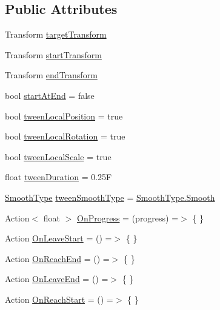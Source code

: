 \subsection*{Public Attributes}
\begin{DoxyCompactItemize}
\item 
Transform \mbox{\hyperlink{class_leap_1_1_unity_1_1_animation_1_1_transform_tween_behaviour_aacffaec9164854dadaa2243119d2ce77}{target\+Transform}}
\item 
Transform \mbox{\hyperlink{class_leap_1_1_unity_1_1_animation_1_1_transform_tween_behaviour_aa8078632530d2648ecc6e7fdaa1df7c2}{start\+Transform}}
\item 
Transform \mbox{\hyperlink{class_leap_1_1_unity_1_1_animation_1_1_transform_tween_behaviour_a9d4e2b6c1c49f7e19b792b05e91a6477}{end\+Transform}}
\item 
bool \mbox{\hyperlink{class_leap_1_1_unity_1_1_animation_1_1_transform_tween_behaviour_a4fade22eb3bbf9f5b006aa32244196ef}{start\+At\+End}} = false
\item 
bool \mbox{\hyperlink{class_leap_1_1_unity_1_1_animation_1_1_transform_tween_behaviour_aea71052a363fe9fa2167ac9f1d92110b}{tween\+Local\+Position}} = true
\item 
bool \mbox{\hyperlink{class_leap_1_1_unity_1_1_animation_1_1_transform_tween_behaviour_a25d98afac92dc1ea10c9853f80441ea7}{tween\+Local\+Rotation}} = true
\item 
bool \mbox{\hyperlink{class_leap_1_1_unity_1_1_animation_1_1_transform_tween_behaviour_a96e636249f28eccf2217d04277a49845}{tween\+Local\+Scale}} = true
\item 
float \mbox{\hyperlink{class_leap_1_1_unity_1_1_animation_1_1_transform_tween_behaviour_a30ac91fdc8ae2b0882b4db4e421b8dbe}{tween\+Duration}} = 0.\+25F
\item 
\mbox{\hyperlink{namespace_leap_1_1_unity_1_1_animation_a9667bc3fe4218574cb25efb892505c77}{Smooth\+Type}} \mbox{\hyperlink{class_leap_1_1_unity_1_1_animation_1_1_transform_tween_behaviour_a092cb4bd8b3e8078d9249bb1adca635b}{tween\+Smooth\+Type}} = \mbox{\hyperlink{namespace_leap_1_1_unity_1_1_animation_a9667bc3fe4218574cb25efb892505c77ae510cdf33cd497134b47b9316314d4b4}{Smooth\+Type.\+Smooth}}
\item 
Action$<$ float $>$ \mbox{\hyperlink{class_leap_1_1_unity_1_1_animation_1_1_transform_tween_behaviour_a1e4baf78f641f965e4950d57ff63fecc}{On\+Progress}} = (progress) =$>$ \{ \}
\item 
Action \mbox{\hyperlink{class_leap_1_1_unity_1_1_animation_1_1_transform_tween_behaviour_aa23f8a0cc75bec0952ae8c773ff627be}{On\+Leave\+Start}} = () =$>$ \{ \}
\item 
Action \mbox{\hyperlink{class_leap_1_1_unity_1_1_animation_1_1_transform_tween_behaviour_a34368ab98363f4db43c183e382aa2451}{On\+Reach\+End}} = () =$>$ \{ \}
\item 
Action \mbox{\hyperlink{class_leap_1_1_unity_1_1_animation_1_1_transform_tween_behaviour_ab20f68f70b439fc640b98244729b0069}{On\+Leave\+End}} = () =$>$ \{ \}
\item 
Action \mbox{\hyperlink{class_leap_1_1_unity_1_1_animation_1_1_transform_tween_behaviour_abc0ae58c0bfaf8a87e8ceb7cb9cdc77f}{On\+Reach\+Start}} = () =$>$ \{ \}
\end{DoxyCompactItemize}
